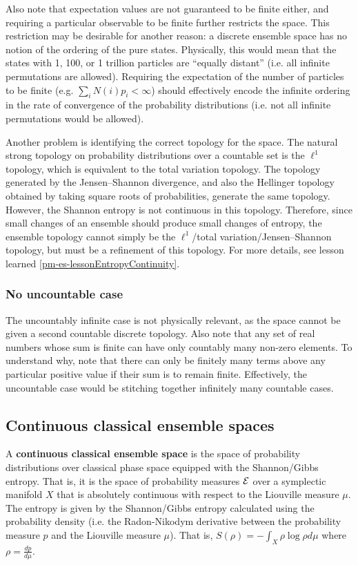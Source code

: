 Also note that expectation values are not guaranteed to be finite either, and requiring a particular observable to be finite further restricts the space. This restriction may be desirable for another reason: a discrete ensemble space has no notion of the ordering of the pure states. Physically, this would mean that the states with 1, 100, or 1 trillion particles are ``equally distant'' (i.e. all infinite permutations are allowed). Requiring the expectation of the number of particles to be finite (e.g. $\sum_i N(i) p_i < \infty$) should effectively encode the infinite ordering in the rate of convergence of the probability distributions (i.e. not all infinite permutations would be allowed).

Another problem is identifying the correct topology for the space. The natural strong topology on probability distributions over a countable set is the $\ell^1$ topology, which is equivalent to the total variation topology. The topology generated by the Jensen--Shannon divergence, and also the Hellinger topology obtained by taking square roots of probabilities, generate the same topology. However, the Shannon entropy is not continuous in this topology. Therefore, since small changes of an ensemble should produce small changes of entropy, the ensemble topology cannot simply be the $\ell^1$/total variation/Jensen--Shannon topology, but must be a refinement of this topology. For more details, see lesson learned \ref{pm-es-lessonEntropyContinuity}.

\subsubsection{No uncountable case}

The uncountably infinite case is not physically relevant, as the space cannot be given a second countable discrete topology. Also note that any set of real numbers whose sum is finite can have only countably many non-zero elements. To understand why, note that there can only be finitely many terms above any particular positive value if their sum is to remain finite. Effectively, the uncountable case would be stitching together infinitely many countable cases.

\subsection{Continuous classical ensemble spaces}

\begin{defn}
	A \textbf{continuous classical ensemble space} is the space of probability distributions over classical phase space equipped with the Shannon/Gibbs entropy. That is, it is the space of probability measures $\mathcal{E}$ over a symplectic manifold $X$ that is absolutely continuous with respect to the Liouville measure $\mu$. The entropy is given by the Shannon/Gibbs entropy calculated using the probability density (i.e. the Radon-Nikodym derivative between the probability measure $p$ and the Liouville measure $\mu$). That is, $S(\rho) = - \int_X \rho \log \rho d\mu$ where $\rho = \frac{dp}{d\mu}$.
\end{defn}

